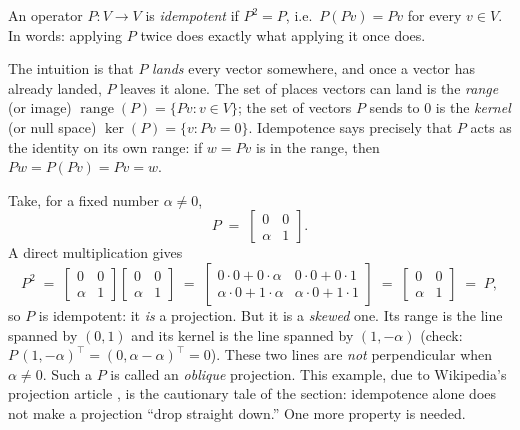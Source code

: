 \begin{definition}[Idempotent]
\label{def:idempotent}
An operator $P : V \to V$ is \emph{idempotent} if $P^2 = P$, i.e.\ $P(Pv) = Pv$ for
every $v \in V$. In words: applying $P$ twice does exactly what applying it once does.
\end{definition}

The intuition is that $P$ \emph{lands} every vector somewhere, and once a vector has
already landed, $P$ leaves it alone. The set of places vectors can land is the
\emph{range} (or image) $\operatorname{range}(P) = \{Pv : v \in V\}$; the set of
vectors $P$ sends to $0$ is the \emph{kernel} (or null space) $\ker(P) = \{v : Pv =
0\}$. Idempotence says precisely that $P$ acts as the identity on its own range: if
$w = Pv$ is in the range, then $Pw = P(Pv) = Pv = w$.

\begin{example}
\label{ex:oblique}
Take, for a fixed number $\alpha \neq 0$,
\[
  P \;=\; \begin{bmatrix} 0 & 0 \\ \alpha & 1 \end{bmatrix}.
\]
A direct multiplication gives
\[
  P^2 \;=\; \begin{bmatrix} 0 & 0 \\ \alpha & 1 \end{bmatrix}
            \begin{bmatrix} 0 & 0 \\ \alpha & 1 \end{bmatrix}
        \;=\; \begin{bmatrix} 0\cdot 0 + 0\cdot\alpha & 0\cdot 0 + 0\cdot 1 \\
                              \alpha\cdot 0 + 1\cdot\alpha & \alpha\cdot 0 + 1\cdot 1
              \end{bmatrix}
        \;=\; \begin{bmatrix} 0 & 0 \\ \alpha & 1 \end{bmatrix} \;=\; P,
\]
so $P$ is idempotent: it \emph{is} a projection. But it is a \emph{skewed} one. Its
range is the line spanned by $(0,1)$ and its kernel is the line spanned by
$(1,-\alpha)$ (check: $P\,(1,-\alpha)^\top = (0, \alpha - \alpha)^\top = 0$). These two
lines are \emph{not} perpendicular when $\alpha \neq 0$. Such a $P$ is called an
\emph{oblique} projection. This example, due to Wikipedia's projection article
\citep{wiki_projection}, is the cautionary tale of the section: idempotence alone does
not make a projection ``drop straight down.'' One more property is needed.
\end{example}

